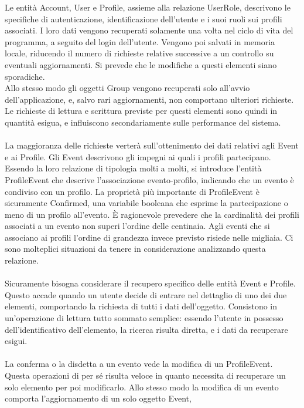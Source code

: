 \clearpage
Le entità Account, User e Profile, assieme alla relazione UserRole, 
descrivono le specifiche di autenticazione, identificazione dell'utente e i suoi ruoli sui profili associati.
I loro dati vengono recuperati solamente una volta nel ciclo di vita del programma, 
a seguito del login dell'utente.
Vengono poi salvati in memoria locale, 
riducendo il numero di richieste relative successive a un controllo su eventuali aggiornamenti.
Si prevede che le modifiche a questi elementi siano sporadiche.\\
Allo stesso modo gli oggetti Group vengono recuperati solo all'avvio dell'applicazione, e, 
salvo rari aggiornamenti, non comportano ulteriori richieste.
Le richieste di lettura e scrittura previste per questi elementi sono quindi in quantità esigua, 
e influiscono secondariamente sulle performance del sistema.\\
\\
La maggioranza delle richieste verterà sull'ottenimento dei dati relativi agli Event e ai Profile. 
Gli Event descrivono gli impegni ai quali i profili partecipano.
Essendo la loro relazione di tipologia molti a molti,
si introduce l'entità ProfileEvent che descrive l'associazione evento-profilo,
indicando che un evento è condiviso con un profilo.
La proprietà più importante di ProfileEvent è sicuramente Confirmed,
una variabile booleana che esprime la partecipazione o meno di un profilo all'evento.
È ragionevole prevedere che la cardinalità dei profili associati a un evento non superi l'ordine delle centinaia.
Agli eventi che si associano ai profili l'ordine di grandezza invece previsto risiede nelle migliaia. 
Ci sono molteplici situazioni da tenere in considerazione analizzando questa relazione.\\
\\
Sicuramente bisogna considerare il recupero specifico delle entità Event e Profile.
Questo accade quando un utente decide di entrare nel dettaglio di uno dei due elementi,
comportando la richiesta di tutti i dati dell'oggetto.
Consistono in un'operazione di lettura tutto sommato semplice:
essendo l'utente in possesso dell'identificativo dell'elemento,
la ricerca risulta diretta, e i dati da recuperare esigui.\\
\\
La conferma o la disdetta a un evento vede la modifica di un ProfileEvent.
Questa operazioni di per sé risulta veloce 
in quanto necessita di recuperare un solo elemento per poi modificarlo.
Allo stesso modo la modifica di un evento comporta l'aggiornamento di un solo oggetto Event,
